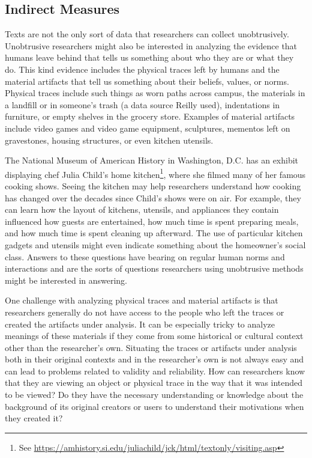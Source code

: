 \subsection{Indirect Measures}

Texts are not the only sort of data that researchers can collect unobtrusively. Unobtrusive researchers might also be interested in analyzing the evidence that humans leave behind that tells us something about who they are or what they do. This kind evidence includes the physical traces left by humans and the material artifacts that tell us something about their beliefs, values, or norms. Physical traces include such things as worn paths across campus, the materials in a landfill or in someone's trash (a data source Reilly used\cite{reilly1987comparison}), indentations in furniture, or empty shelves in the grocery store. Examples of material artifacts include video games and video game equipment, sculptures, mementos left on gravestones, housing structures, or even kitchen utensils.

The National Museum of American History in Washington, D.C. has an exhibit displaying chef Julia Child's home kitchen\footnote{See \url{https://amhistory.si.edu/juliachild/jck/html/textonly/visiting.asp}}, where she filmed many of her famous cooking shows. Seeing the kitchen may help researchers understand how cooking has changed over the decades since Child's shows were on air. For example, they can learn how the layout of kitchens, utensils, and appliances they contain influenced how guests are entertained, how much time is spent preparing meals, and how much time is spent cleaning up afterward. The use of particular kitchen gadgets and utensils might even indicate something about the homeowner's social class. Answers to these questions have bearing on regular human norms and interactions and are the sorts of questions researchers using unobtrusive methods might be interested in answering.

One challenge with analyzing physical traces and material artifacts is that researchers generally do not have access to the people who left the traces or created the artifacts under analysis. It can be especially tricky to analyze meanings of these materials if they come from some historical or cultural context other than the researcher's own. Situating the traces or artifacts under analysis both in their original contexts and in the researcher's own is not always easy and can lead to problems related to validity and reliability. How can researchers know that they are viewing an object or physical trace in the way that it was intended to be viewed? Do they have the necessary understanding or knowledge about the background of its original creators or users to understand their motivations when they created it?


